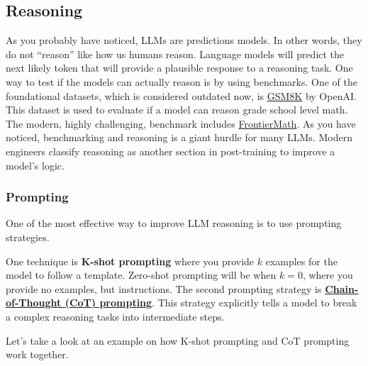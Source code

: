 \documentclass[../main.tex]{subfiles}
\begin{document}
\subsection{Reasoning}

As you probably have noticed, LLMs are predictions models.
In other words, they do not ``reason'' like how us humans
reason. Language models will predict the next likely token
that will provide a plausible response to a reasoning task.
One way to test if the models can actually reason is by
using benchmarks. One of the foundational datasets, which
is considered outdated now, is
\href{https://huggingface.co/datasets/openai/gsm8k}{GSM8K}
by OpenAI. This dataset is used to evaluate if a model can
reason grade school level math. The modern, highly challenging,
benchmark includes \href{https://epoch.ai/frontiermath}{FrontierMath}.
As you have noticed, benchmarking and reasoning is a giant
hurdle for many LLMs. Modern engineers classify reasoning
as another section in post-training to improve a model's logic.

\subsubsection{Prompting}

One of the most effective way to improve LLM reasoning is
to use prompting strategies.

\begin{definition}{}{}
One technique is \textbf{K-shot prompting} where you provide
$k$ examples for the model to follow a template. Zero-shot
prompting will be when $k = 0$, where you provide no examples,
but instructions. The second prompting strategy is \textbf{
\href{https://arxiv.org/abs/2201.11903}{Chain-of-Thought (CoT)
prompting}}. This strategy explicitly tells a model to break
a complex reasoning tasks into intermediate steps. 
\end{definition}

Let's take a look at an example on how K-shot prompting and
CoT prompting work together.
\end{document}

